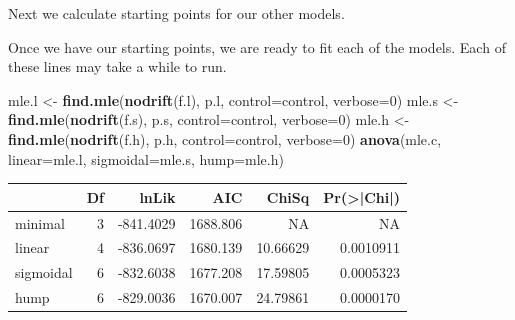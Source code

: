 \documentclass[
]{book}
\newenvironment{Shaded}{\begin{snugshade}}{\end{snugshade}}
\newcommand{\DataTypeTok}[1]{\textcolor[rgb]{0.13,0.29,0.53}{#1}}
\newcommand{\DecValTok}[1]{\textcolor[rgb]{0.00,0.00,0.81}{#1}}
\newcommand{\KeywordTok}[1]{\textcolor[rgb]{0.13,0.29,0.53}{\textbf{#1}}}
\newcommand{\NormalTok}[1]{#1}
\newcommand{\OperatorTok}[1]{\textcolor[rgb]{0.81,0.36,0.00}{\textbf{#1}}}
\newcommand{\StringTok}[1]{\textcolor[rgb]{0.31,0.60,0.02}{#1}}
\begin{document}
Next we calculate starting points for our other models.

\begin{Shaded}
\end{Shaded}

Once we have our starting points, we are ready to fit each of the models. Each of these lines may take a while to run.

\begin{Shaded}
\begin{Highlighting}[]
\NormalTok{mle.l \textless{}{-}}\StringTok{ }\KeywordTok{find.mle}\NormalTok{(}\KeywordTok{nodrift}\NormalTok{(f.l), p.l, }\DataTypeTok{control=}\NormalTok{control, }\DataTypeTok{verbose=}\DecValTok{0}\NormalTok{)}
\NormalTok{mle.s \textless{}{-}}\StringTok{ }\KeywordTok{find.mle}\NormalTok{(}\KeywordTok{nodrift}\NormalTok{(f.s), p.s, }\DataTypeTok{control=}\NormalTok{control, }\DataTypeTok{verbose=}\DecValTok{0}\NormalTok{)}
\NormalTok{mle.h \textless{}{-}}\StringTok{ }\KeywordTok{find.mle}\NormalTok{(}\KeywordTok{nodrift}\NormalTok{(f.h), p.h, }\DataTypeTok{control=}\NormalTok{control, }\DataTypeTok{verbose=}\DecValTok{0}\NormalTok{)}
\KeywordTok{anova}\NormalTok{(mle.c, }\DataTypeTok{linear=}\NormalTok{mle.l, }\DataTypeTok{sigmoidal=}\NormalTok{mle.s, }\DataTypeTok{hump=}\NormalTok{mle.h)}
\end{Highlighting}
\end{Shaded}

\begin{tabular}{l|r|r|r|r|r}
\hline
  & Df & lnLik & AIC & ChiSq & Pr(>|Chi|)\\
\hline
minimal & 3 & -841.4029 & 1688.806 & NA & NA\\
\hline
linear & 4 & -836.0697 & 1680.139 & 10.66629 & 0.0010911\\
\hline
sigmoidal & 6 & -832.6038 & 1677.208 & 17.59805 & 0.0005323\\
\hline
hump & 6 & -829.0036 & 1670.007 & 24.79861 & 0.0000170\\
\hline
\end{tabular}
\end{document}
